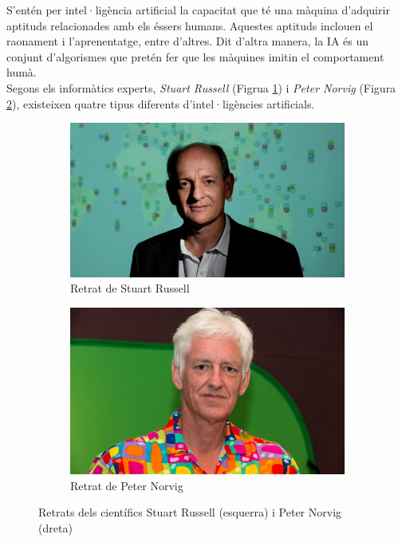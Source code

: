 \documentclass[a4paper,12pt]{article}
\begin{document}
S'entén per intel·ligència artificial la capacitat que té una màquina d'adquirir aptituds relacionades amb els éssers humans. Aquestes aptituds inclouen el raonament i l'aprenentatge, entre d'altres. Dit d'altra manera, la IA és un conjunt d'algorismes que pretén fer que les màquines imitin el comportament humà.\\
Segons els informàtics experts, \textit{Stuart Russell} (Figrua \ref{fig:russell}) i \textit{Peter Norvig} (Figura \ref{fig:norvig}), existeixen quatre tipus diferents d'intel·ligències artificials.
\begin{figure}[h!]
    \centering
    \begin{subfigure}[b]{0.48\linewidth}
        \includegraphics[width=\linewidth]{images/russell-aqua.jpg}
        \caption{Retrat de Stuart Russell}
        \label{fig:russell}
    \end{subfigure}
    \begin{subfigure}[b]{0.45\linewidth}
        \includegraphics[width=\linewidth]{images/peter_norvig_speaking_at_university_of_california_berkeley_2013.jpg}
        \caption{Retrat de Peter Norvig}
        \label{fig:norvig}
    \end{subfigure}
    \caption{Retrats dels científics Stuart Russell (esquerra) i Peter Norvig (dreta)}
    \label{fig:StuartNorvig}
\end{figure}
\end{document}
